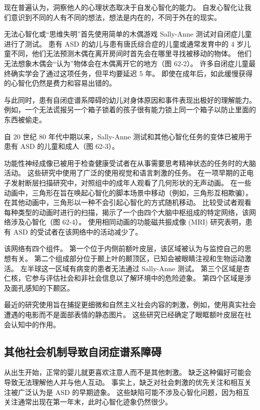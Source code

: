 现在普遍认为，洞察他人的心理状态取决于自发心智化的能力。 自发心智化让我们意识到不同的人有不同的想法，想法是内在的，不同于外在的现实。

无法心智化或“思维失明”首先使用简单的木偶游戏 Sally-Anne 测试对自闭症儿童进行了测试。 患有 ASD 的幼儿与患有唐氏综合症的儿童或通常发育中的 4 岁儿童不同，他们无法预测木偶在离开房间时首先会在哪里寻找被移动的物体。 他们无法想象木偶会“认为”物体会在木偶离开它的地方（图 62-2）。 许多自闭症儿童最终确实学会了通过这项任务，但平均要延迟 5 年。 即使在成年后，如此缓慢获得的心智化仍然是费力和容易出错的。

与此同时，患有自闭症谱系障碍的幼儿对身体原因和事件表现出极好的理解能力。 例如，一个无法谎报另一个箱子锁着的孩子很有能力锁上同一个箱子以防止里面的东西被偷走。

自 20 世纪 80 年代中期以来，Sally-Anne 测试和其他心智化任务的变体已被用于患有 ASD 的儿童和成人（图 62-3）。

功能性神经成像已被用于检查健康受试者在从事需要思考精神状态的任务时的大脑活动。 这些研究中使用了广泛的使用视觉和语言刺激的任务。 在一项早期的正电子发射断层扫描研究中，对照组中的成年人观看了几何形状的无声动画。 在一些动画中，三角形在旨在唤起心智化的脚本场景中移动（例如，三角形互相欺骗）。 在其他动画中，三角形以一种不会引起心智化的方式随机移动。 比较受试者观看每种类型的动画时进行的扫描，揭示了一个由四个大脑中枢组成的特定网络，该网络涉及心智化（图 62-4）。 使用相同动画的功能磁共振成像 (MRI) 研究表明，患有 ASD 的受试者在该网络中的活动减少了。

该网络有四个组件。 第一个位于内侧前额叶皮层，该区域被认为与监控自己的思想有关。 第二个组成部分位于颞上叶的颞顶区，已知会被眼睛注视和生物运动激活。 左半球这一区域有病变的患者无法通过 Sally-Anne 测试。 第三个区域是杏仁核，它参与评估社会和非社会信息以了解环境中的危险迹象。 第四个区域是涉及面孔感知的下颞区。

最近的研究使用旨在捕捉更细微和自然主义社会内容的刺激，例如，使用真实社会遭遇的电影而不是面部表情的静态图片。 这些研究已经确定了眼眶额叶皮层在社会认知中的作用。


\subsection{其他社会机制导致自闭症谱系障碍}


从出生开始，正常的婴儿就更喜欢注意人而不是其他刺激。 缺乏这种偏好可能会导致无法理解他人并与他人互动。 事实上，缺乏对社会刺激的优先关注和相互关注被广泛认为是 ASD 的早期迹象。 这些缺陷可能不涉及心智化问题，因为相互关注通常出现在第一年末，此时心智化迹象仍然很少。

